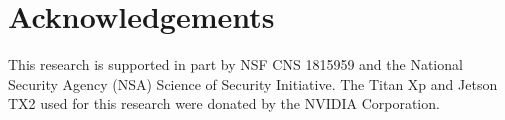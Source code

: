 \section*{Acknowledgements} \label{acknowledge}
This research is supported in part by NSF CNS 1815959 and the National Security Agency (NSA) Science of Security Initiative.
The Titan Xp and Jetson TX2 used for this research were donated by the
NVIDIA Corporation.
